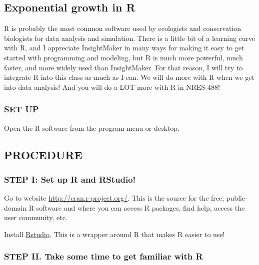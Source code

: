 \documentclass[
]{article}
\begin{document}
\hypertarget{exponential-growth-in-r}{%
\subsection{Exponential growth in R}\label{exponential-growth-in-r}}

R is probably the most common software used by ecologists and
conservation biologists for data analysis and simulation. There is a
little bit of a learning curve with R, and I appreciate InsightMaker in
many ways for making it easy to get started with programming and
modeling, but R is much more powerful, much faster, and more widely used
than InsightMaker. For that reason, I will try to integrate R into this
class as much as I can. We will do more with R when we get into data
analysis! And you will do a LOT more with R in NRES 488!

\hypertarget{set-up}{%
\subsubsection{SET UP}\label{set-up}}

Open the R software from the program menu or desktop.

\hypertarget{procedure}{%
\subsection{PROCEDURE}\label{procedure}}

\hypertarget{step-i-set-up-r-and-rstudio}{%
\subsubsection{STEP I: Set up R and
RStudio!}\label{step-i-set-up-r-and-rstudio}}

Go to website \url{http://cran.r-project.org/}. This is the source for
the free, public-domain R software and where you can access R packages,
find help, access the user community, etc.

Install \href{https://rstudio.com/products/rstudio/download/}{Rstudio}.
This is a wrapper around R that makes R easier to use!

\hypertarget{step-ii.-take-some-time-to-get-familiar-with-r}{%
\subsubsection{STEP II. Take some time to get familiar with
R}\label{step-ii.-take-some-time-to-get-familiar-with-r}}
\end{document}
